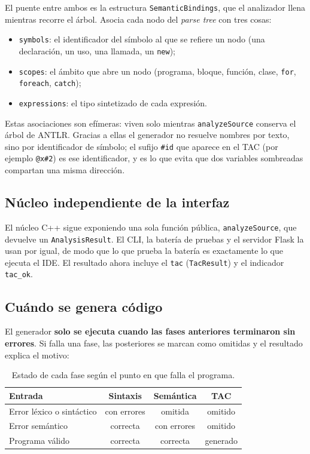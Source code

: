 \documentclass[11pt,a4paper]{article}
\begin{document}
El puente entre ambos es la estructura \texttt{SemanticBindings}, que el
analizador llena mientras recorre el árbol. Asocia cada nodo del
\emph{parse tree} con tres cosas:

\begin{itemize}[leftmargin=1.4em]
  \item \texttt{symbols}: el identificador del símbolo al que se refiere un
        nodo (una declaración, un uso, una llamada, un \texttt{new});
  \item \texttt{scopes}: el ámbito que abre un nodo (programa, bloque, función,
        clase, \texttt{for}, \texttt{foreach}, \texttt{catch});
  \item \texttt{expressions}: el tipo sintetizado de cada expresión.
\end{itemize}

Estas asociaciones son efímeras: viven solo mientras \texttt{analyzeSource}
conserva el árbol de ANTLR. Gracias a ellas el generador no resuelve nombres
por texto, sino por identificador de símbolo; el sufijo \texttt{\#id} que
aparece en el TAC (por ejemplo \texttt{@x\#2}) es ese identificador, y es lo que
evita que dos variables sombreadas compartan una misma dirección.

\subsection{Núcleo independiente de la interfaz}

El núcleo C++ sigue exponiendo una sola función pública, \texttt{analyzeSource},
que devuelve un \texttt{AnalysisResult}. El CLI, la batería de pruebas y el
servidor Flask la usan por igual, de modo que lo que prueba la batería es
exactamente lo que ejecuta el IDE. El resultado ahora incluye el \texttt{tac}
(\texttt{TacResult}) y el indicador \texttt{tac\_ok}.

\subsection{Cuándo se genera código}

El generador \textbf{solo se ejecuta cuando las fases anteriores terminaron sin
errores}. Si falla una fase, las posteriores se marcan como omitidas y el
resultado explica el motivo:

\begin{table}[H]
\centering
\small
\begin{tabular}{@{}L{4.3cm}ccc@{}}
\toprule
\textbf{Entrada} & \textbf{Sintaxis} & \textbf{Semántica} & \textbf{TAC} \\
\midrule
Error léxico o sintáctico & con errores & omitida & omitido \\
Error semántico & correcta & con errores & omitido \\
Programa válido & correcta & correcta & generado \\
\bottomrule
\end{tabular}
\caption{Estado de cada fase según el punto en que falla el programa.}
\end{table}
\end{document}
